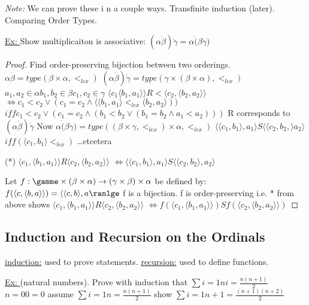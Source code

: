 \documentclass{article}
\begin{document}
    \emph{Note:} We can prove these i n a couple ways.
    Transfinite induction (later).
    Comparing Order Types.

    \underline{Ex: } Show multiplicaiton is associative:
    $ (\alpha \dot \beta) \dot \gamma = \alpha \dot (\beta \dot \gamma)$
    \begin{proof}
        Find order-preserving bijection between two orderings.
        $\alpha \dot \beta = type(\beta \times \alpha, <_{lex})$
        $(\alpha \dot \beta) \dot \gamma = type(\gamma \times (\beta \times \alpha), <_{lex})$
        $a_1, a_2 \in \alpha b_1, b_2 \in \beta c_1,c_2 \in \gamma$
        $\langle c_1 \langle b_1, a_1 \rangle \rangle R < \langle c_2, \langle b_2,a_2 \rangle \rangle$
        $\iff c_1 < c_2 \vee ( c_1 = c_2 \wedge \langle \langle b_1, a_1 \rangle <_{lex} \langle b_2, a_2 \rangle ))$
        $iff c_1 < c_2 \vee ( c_1 = c_2 \wedge (b_1 < b_2 \vee (b_1 = b_2 \wedge a_1 < a_2)))$
        R corresponds to $(\alpha \dot \beta) \dot \gamma$
        Now $\alpha \dot (\beta \dot \gamma) = type ((\beta \times \gamma, <_{lex})\times \alpha, <_{lex})$
        $\langle \langle c_1,b_1\rangle,a_1\rangle S \langle\langle c_2,b_2,\rangle a_2\rangle$
        $iff (\langle c_1,b_1\rangle <_{lex})$ \dots etcetera

        (*) $\langle c_1,\langle b_1, a_1 \rangle \rangle R \langle c_2, \langle b_2, a_2 \rangle \rangle$
        $\iff \langle \langle c_1, b_1 \rangle , a_1 \rangle S \langle \langle c_2, b_2 \rangle , a_2 \rangle$

        Let $f : \gamme \times (\beta \times \alpha) \rightarrow (\gamma \times \beta) \times \alpha$
        be defined by:
        $f(\langle c, \langle b, a \rangle \rangle) = \langle \langle c, b \rangle , a \ranlge$
        f is a bijection.
        f is order-preserving i.e. * from above
        shows $\langle c_1, \langle b_1, a_1 \rangle \rangle R \langle c_2, \langle b_2, a_2 \rangle \rangle$
        $\iff f(\langle c_1, \langle b_1, a_1 \rangle \rangle) S f(\langle c_2, \langle b_2, a_2 \rangle \rangle )$
    \end{proof}

    \subsection{Induction and Recursion on the Ordinals}
    \underline{induction:} used to prove statements.
    \underline{recursion:} used to define functions.

    \underline{Ex: } (natural numbers).
    Prove with induction that $\sum{i=1}{n} i = \frac{n(n+1)}{2}$
    $n=0 0=0$
    assume $\sum{i=1}{n} = \frac{n(n+1)}{2}$
    show $\sum{i=1}{n+1} = \frac{(n+1)(n+2)}{2}$
\end{document}
